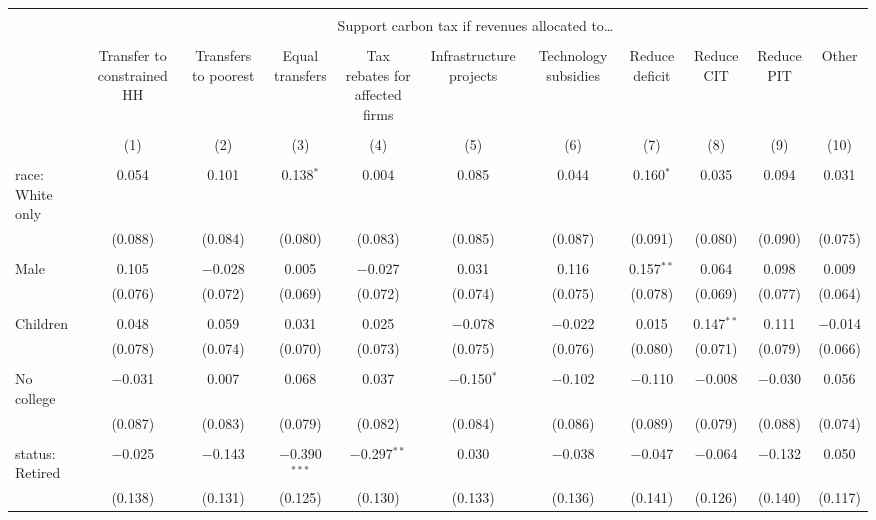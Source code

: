 
\begin{tabular}{@{\extracolsep{5pt}}lcccccccccc} 
\\[-1.8ex]\hline 
\hline \\[-1.8ex] 
 & \multicolumn{10}{c}{Support carbon tax if revenues allocated to…} \\ 
\cline{2-11} 
\\[-1.8ex] & Transfer to constrained HH & Transfers to poorest & Equal transfers & Tax rebates for affected firms & Infrastructure projects & Technology subsidies & Reduce deficit & Reduce CIT & Reduce PIT & Other \\ 
\\[-1.8ex] & (1) & (2) & (3) & (4) & (5) & (6) & (7) & (8) & (9) & (10)\\ 
\hline \\[-1.8ex] 
 race: White only & 0.054 & 0.101 & 0.138$^{*}$ & 0.004 & 0.085 & 0.044 & 0.160$^{*}$ & 0.035 & 0.094 & 0.031 \\ 
  & (0.088) & (0.084) & (0.080) & (0.083) & (0.085) & (0.087) & (0.091) & (0.080) & (0.090) & (0.075) \\ 
  & & & & & & & & & & \\ 
 Male & 0.105 & $-$0.028 & 0.005 & $-$0.027 & 0.031 & 0.116 & 0.157$^{**}$ & 0.064 & 0.098 & 0.009 \\ 
  & (0.076) & (0.072) & (0.069) & (0.072) & (0.074) & (0.075) & (0.078) & (0.069) & (0.077) & (0.064) \\ 
  & & & & & & & & & & \\ 
 Children & 0.048 & 0.059 & 0.031 & 0.025 & $-$0.078 & $-$0.022 & 0.015 & 0.147$^{**}$ & 0.111 & $-$0.014 \\ 
  & (0.078) & (0.074) & (0.070) & (0.073) & (0.075) & (0.076) & (0.080) & (0.071) & (0.079) & (0.066) \\ 
  & & & & & & & & & & \\ 
 No college & $-$0.031 & 0.007 & 0.068 & 0.037 & $-$0.150$^{*}$ & $-$0.102 & $-$0.110 & $-$0.008 & $-$0.030 & 0.056 \\ 
  & (0.087) & (0.083) & (0.079) & (0.082) & (0.084) & (0.086) & (0.089) & (0.079) & (0.088) & (0.074) \\ 
  & & & & & & & & & & \\ 
 status: Retired & $-$0.025 & $-$0.143 & $-$0.390$^{***}$ & $-$0.297$^{**}$ & 0.030 & $-$0.038 & $-$0.047 & $-$0.064 & $-$0.132 & 0.050 \\ 
  & (0.138) & (0.131) & (0.125) & (0.130) & (0.133) & (0.136) & (0.141) & (0.126) & (0.140) & (0.117) \\ 

\end{tabular}
